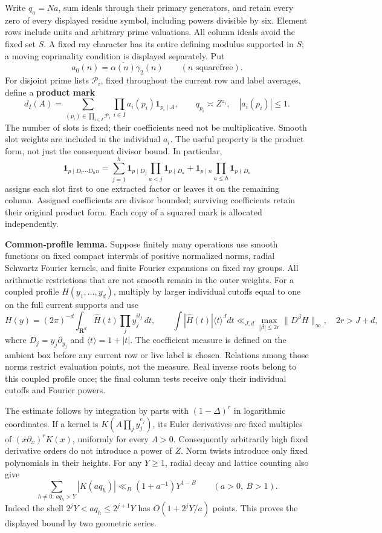 \documentclass[11pt,a4paper]{article}
\begin{document}
Write \(q_a=Na\), sum ideals through their primary generators, and
retain every zero of every displayed residue symbol, including powers
divisible by six. Element rows include units and arbitrary prime
valuations. All column ideals avoid the fixed set \(S\). A fixed ray
character has its entire defining modulus supported in \(S\); a moving
coprimality condition is displayed separately. Put \[
a_0(n)=\overline{\alpha(n)}\gamma_2(n)\qquad(n\text{ squarefree}).
\] For disjoint prime lists \(\mathcal P_i\), fixed throughout the
current row and label averages, define a \textbf{product mark} \[
d_I(A)=\sum_{(p_i)\in\prod_{i\in I}\mathcal P_i}
       \prod_{i\in I}a_i(p_i)\mathbf1_{p_i\mid A},
\qquad q_{p_i}\asymp Z^{z_i},\quad |a_i(p_i)|\le1.
\tag{B3.1}
\] The number of slots is fixed; their coefficients need not be
multiplicative. Smooth slot weights are included in the individual
\(a_i\). The useful property is the product form, not just the
consequent divisor bound. In particular, \[
\mathbf1_{p\mid D_1\cdots D_h n}
=\sum_{j=1}^h\mathbf1_{p\mid D_j}\prod_{a<j}\mathbf1_{p\nmid D_a}
 +\mathbf1_{p\mid n}\prod_{a\le h}\mathbf1_{p\nmid D_a}
\tag{B3.2}
\] assigns each slot first to one extracted factor or leaves it on the
remaining column. Assigned coefficients are divisor bounded; surviving
coefficients retain their original product form. Each copy of a squared
mark is allocated independently.

\textbf{Common-profile lemma.} Suppose finitely many operations use
smooth functions on fixed compact intervals of positive normalized
norms, radial Schwartz Fourier kernels, and finite Fourier expansions on
fixed ray groups. All arithmetic restrictions that are not smooth remain
in the outer weights. For a coupled profile \(H(y_1,\allowbreak{}\ldots,\allowbreak{}y_d)\),
multiply by larger individual cutoffs equal to one on the full current
supports and use \[
H(y)=(2\pi)^{-d}\int_{\mathbf R^d}\widehat H(t)\prod_jy_j^{it_j}\,dt,
\qquad
\int|\widehat H(t)|\langle t\rangle^Jdt
 \ll_{J,d}\max_{|\beta|\le2r}\|D^\beta H\|_\infty,
\quad 2r>J+d,
\tag{B3.3}
\] where \(D_j=y_j\partial_{y_j}\) and \(\langle t\rangle=1+|t|\). The
coefficient measure is defined on the ambient box before any current row
or live label is chosen. Relations among those norms restrict evaluation
points, not the measure. Real inverse roots belong to this coupled
profile once; the final column tests receive only their individual
cutoffs and Fourier powers.

The estimate follows by integration by parts with \((1-\Delta)^r\) in
logarithmic coordinates. If a kernel is \(K(A\prod_jy_j^{e_j})\), its
Euler derivatives are fixed multiples of \((x\partial_x)^rK(x)\),
uniformly for every \(A>0\). Consequently arbitrarily high fixed
derivative orders do not introduce a power of \(Z\). Norm twists
introduce only fixed polynomials in their heights. For any \(Y\ge1\),
radial decay and lattice counting also give \[
\sum_{h\ne0:\,a q_h>Y}|K(aq_h)|
 \ll_B(1+a^{-1})Y^{1-B}\qquad(a>0,\ B>1).
\tag{B3.4}
\] Indeed the shell \(2^jY<aq_h\le2^{j+1}Y\) has \(O(1+2^jY/a)\) points.
This proves the displayed bound by two geometric series.
\end{document}
